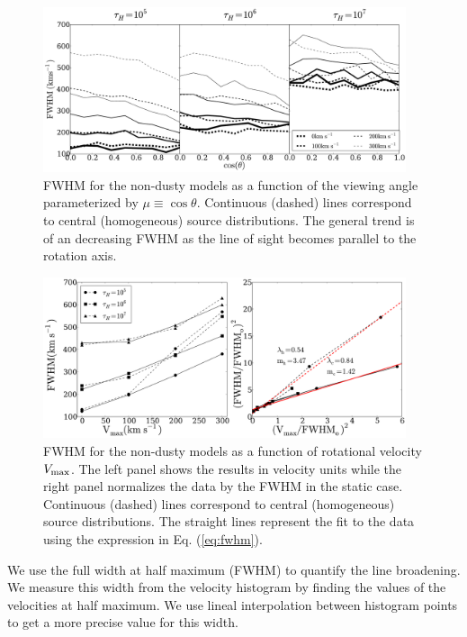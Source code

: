\documentclass{emulateapj}
\begin{document}
\begin{figure}
\begin{center}
  \includegraphics[width=0.95\textwidth]{f6.pdf}
\end{center}
  \caption{FWHM for the non-dusty models as a function of the viewing
  angle parameterized by $\mu\equiv\cos\theta$. 
  Continuous (dashed) lines  correspond to central (homogeneous)
  source distributions. The general trend is of an decreasing FWHM as
  the line of sight becomes parallel to the rotation axis. 
  \label{fig:widthvsmu}} 
\end{figure}

\begin{figure}
\begin{center}
  \includegraphics[width=0.95\textwidth]{f7.pdf}
\end{center}
\caption{FWHM for the non-dusty models as a function of
  rotational velocity $V_{\rm max}$. The left panel shows the
  results in velocity units while the right panel normalizes
  the data by the FWHM in the static case. 
  Continuous (dashed) lines  correspond to central (homogeneous)
  source distributions. The straight lines represent the fit to
  the data using the expression in Eq. (\ref{eq:fwhm}).
  \label{fig:widthsvsvelocity}}
\end{figure}


We use the full width at half maximum (FWHM) to quantify the line
broadening. We measure this width from the velocity histogram by
finding the values of the velocities at half maximum. We use lineal
interpolation between histogram points to get a more precise value for
this width.
\end{document}
